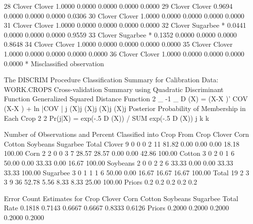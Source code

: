 \documentclass{article}
\begin{document}
\begin{Woutput}
 28    Clover      Clover          1.0000      0.0000      0.0000      0.0000      0.0000
 29    Clover      Clover          0.9694      0.0000      0.0000      0.0000      0.0306
 30    Clover      Clover          1.0000      0.0000      0.0000      0.0000      0.0000
 31    Clover      Clover          1.0000      0.0000      0.0000      0.0000      0.0000
 32    Clover      Sugarbee *      0.0441      0.0000      0.0000      0.0000      0.9559
 33    Clover      Sugarbee *      0.1352      0.0000      0.0000      0.0000      0.8648
 34    Clover      Clover          1.0000      0.0000      0.0000      0.0000      0.0000
 35    Clover      Clover          1.0000      0.0000      0.0000      0.0000      0.0000
 36    Clover      Clover          1.0000      0.0000      0.0000      0.0000      0.0000
* Misclassified observation

The DISCRIM Procedure
Classification Summary for Calibration Data: WORK.CROPS
Cross-validation Summary using Quadratic Discriminant Function
Generalized Squared Distance Function
 2         _          -1     _
D (X) = (X-X    )' COV    (X-X    ) + ln |COV    |
 j          (X)j      (X)j    (X)j           (X)j
Posterior Probability of Membership in Each Crop
                   2                    2
Pr(j|X) = exp(-.5 D (X)) / SUM exp(-.5 D (X))
                   j        k           k

                Number of Observations and Percent Classified into Crop
From
Crop           Clover         Corn       Cotton      Soybeans      Sugarbee        Total
Clover              9            0            0             0             2           11
                81.82         0.00         0.00          0.00         18.18       100.00
Corn                2            2            0             0             3            7
                28.57        28.57         0.00          0.00         42.86       100.00
Cotton              3            0            2             0             1            6
                50.00         0.00        33.33          0.00         16.67       100.00
Soybeans            2            0            0             2             2            6
                33.33         0.00         0.00         33.33         33.33       100.00
Sugarbee            3            0            1             1             1            6
                50.00         0.00        16.67         16.67         16.67       100.00
Total              19            2            3             3             9           36
                52.78         5.56         8.33          8.33         25.00       100.00
Priors            0.2          0.2          0.2           0.2           0.2

                           Error Count Estimates for Crop
                  Clover        Corn      Cotton    Soybeans    Sugarbee       Total
Rate              0.1818      0.7143      0.6667      0.6667      0.8333      0.6126
Priors            0.2000      0.2000      0.2000      0.2000      0.2000
\end{Woutput}
\end{document}
